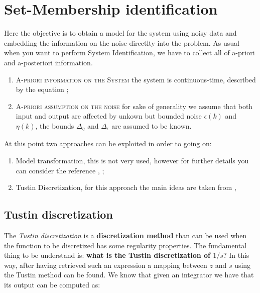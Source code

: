 \section{Set-Membership identification}
Here the objective is to obtain a model for the system using noisy data and embedding the information on the noise directlty into the problem. As usual when you want to perform System Identification, we have to collect all of a-priori and a-posteriori information. 
\begin{enumerate}
    \item \textsc{A-priori information on the System} the system is continuous-time, described by the equation ; 
    \item \textsc{A-priori assumption on the noise} for sake of generality we assume that both input and output are affected by unkown but bounded noise $\epsilon(k)$ and $\eta(k)$, the bounds $\Delta_\eta$ and $\Delta_\epsilon$ are assumed to be known.
\end{enumerate}

At this point two approaches can be exploited in order to going on:
\begin{enumerate}
    \item \textsf{Model transformation}, this is not very used, however for further details you can consider the reference \citeauthor{johansson1994identification} ,  \cite{johansson1994identification}; 
    \item \textsf{Tustin Discretization}, for this approach the main ideas are taken from \citeauthor{cerone2022set} ,  \cite{cerone2022set}
\end{enumerate}

\subsection{Tustin discretization}
The \textit{Tustin discretization} is a \textbf{discretization method} than can be used when the function to be discretized has some regularity properties. The fundamental thing to be understand is: \textbf{what is the Tustin discretization of $1/s$}? In this way, after having retrieved such an expression a mapping between $z$ and $s$ using the Tustin method can be found. We know that given an integrator we have that its output can be computed as: 

